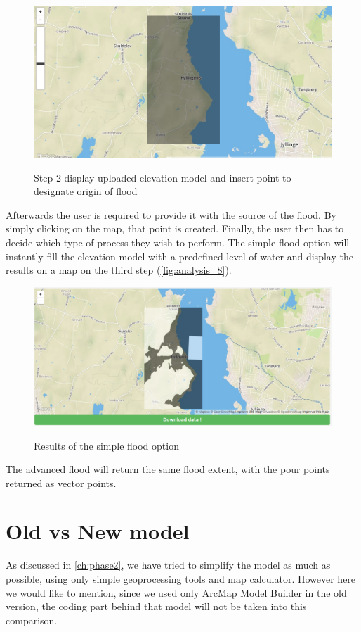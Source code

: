 \begin{figure}[h!]
\centering
	{\includegraphics[width=0.80\linewidth]{gfx/Analysis_Website/suckmycock.PNG}}
\caption{Step 2 display uploaded elevation model and insert point to designate origin of flood}
\label{fig:analysis_7}
\end{figure}

Afterwards the user is required to provide it with the source of the flood. By simply clicking on the map, that point is created. 
Finally, the user then has to decide which type of process they wish to perform. The simple flood option will instantly fill the elevation model with a predefined level of water and display the results on a map on the third step (\autoref{fig:analysis_8}).

\begin{figure}[h!]
\centering
	{\includegraphics[width=\linewidth]{gfx/Analysis_Website/8.png}}
\caption{Results of the simple flood option}
\label{fig:analysis_8}
\end{figure}

The advanced flood will return the same flood extent, with the pour points returned as vector points. 

\section{Old vs New model}
As discussed in \autoref{ch:phase2}, we have tried to simplify the model as much as possible, using only simple geoprocessing tools and map calculator. However here we would like to mention, since we used only ArcMap Model Builder in the old version, the coding part behind that model will not be taken into this comparison.

